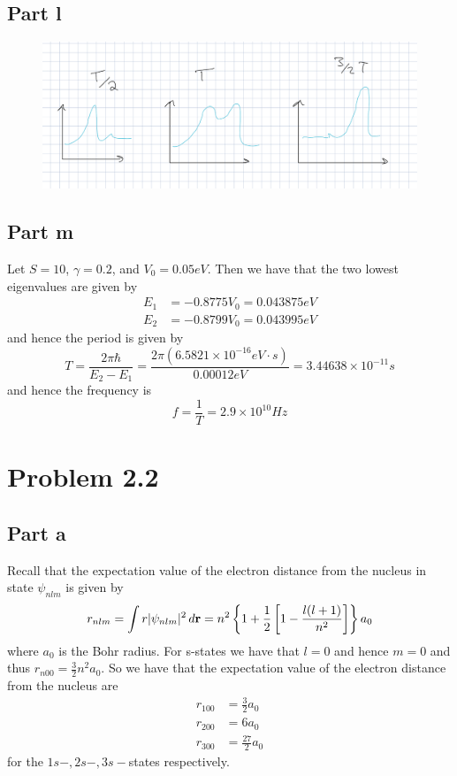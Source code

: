 \documentclass[12pt]{report}
\begin{document}
\subsection*{Part l}
\begin{figure}[H]
  \centering
  \includegraphics[scale=0.6]{qual.png}
  \label{fig:enter-label}
\end{figure}
\subsection*{Part m}
Let $S = 10$, $\gamma = 0.2$, and $V_0 = 0.05 \si{eV}$. Then we have that the two lowest eigenvalues are given by
\begin{align*}
  E_1 &= -0.8775 V_0 = 0.043875 \si{eV}\\
  E_2 &= -0.8799 V_0 = 0.043995 \si{eV}
\end{align*}
and hence the period is given by
\begin{equation*}
  T = \frac{2\pi\hbar}{E_2 - E_1} = \frac{2\pi(6.5821 \times 10^{-16}\si{eV \cdot s})}{0.00012\si{eV}} = 3.44638 \times 10^{-11} \si{s}
\end{equation*}
and hence the frequency is
\begin{equation*}
  f = \frac{1}{T} = 2.9 \times 10^{10} \si{Hz}
\end{equation*}

\section*{Problem 2.2}
\subsection*{Part a}
Recall that the expectation value of the electron distance from the nucleus in state $\psi_{nlm}$ is given by
\begin{equation*}
  r_{nlm} = \int r |\psi_{nlm}|^2 \, d\bold{r} = n^2 \left\{ 1 + \frac{1}{2} \left[1 - \frac{l(l+1)}{n^2}\right]\right\} a_0
\end{equation*}
where $a_0$ is the Bohr radius. For s-states we have that $l = 0$ and hence $m=0$ and thus $r_{n00} = \frac{3}{2}n^2 a_0$. So we have that the expectation value of the electron distance from the nucleus are
\begin{align*}
  r_{100} &= \frac{3}{2} a_0 \\
  r_{200} &= 6 a_0 \\
  r_{300} &= \frac{27}{2} a_0
\end{align*}
for the $1s-,2s-,3s-$states respectively.
\end{document}

